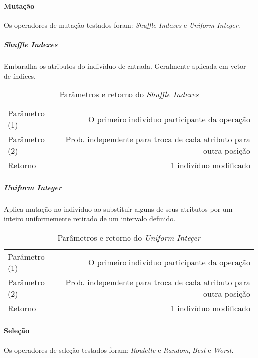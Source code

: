 \paragraph{Mutação}
Os operadores de mutação testados foram: {\it Shuffle Indexes} e {\it Uniform Integer}.\\
\subparagraph{Shuffle Indexes}
Embaralha os atributos do indivíduo de entrada. Geralmente aplicada em vetor de índices.\\

\begin{table}[!h]
  \begin{center}
  \begin{tabular}{|l|r|}
    \hline
    Parâmetro (1) & O primeiro indivíduo participante da operação \\
    Parâmetro (2) & Prob. independente para troca de cada atributo para outra posição\\
    Retorno & 1 indivíduo modificado\\
    \hline    
  \end{tabular}
  \end{center}
  \caption{Parâmetros e retorno do {\it Shuffle Indexes}}
  \label{Shuffle Indexes}
\end{table}

\subparagraph{Uniform Integer}
Aplica mutação no indivíduo ao substituir alguns de seus atributos por um inteiro uniformemente retirado de um intervalo definido.\\

\begin{table}[!h]
  \begin{center}
  \begin{tabular}{|l|r|}
    \hline
    Parâmetro (1) & O primeiro indivíduo participante da operação \\
    Parâmetro (2) & Prob. independente para troca de cada atributo para outra posição\\
    Retorno & 1 indivíduo modificado\\
    \hline    
  \end{tabular}
  \end{center}
  \caption{Parâmetros e retorno do {\it Uniform Integer}}
  \label{Uniform Integer}
\end{table}

\paragraph{Seleção}
Os operadores de seleção testados foram: {\it Roulette} e {\it Random}, {\it Best} e {\it Worst}.\\


